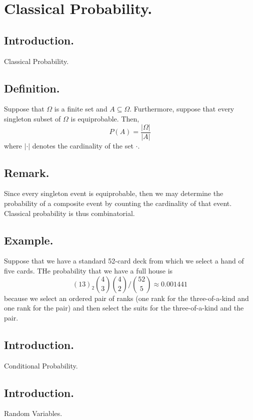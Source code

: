 \documentclass[titlepage]{article}
\begin{document}
\newpage \section{Classical Probability.}

\subsection{Introduction.} Classical Probability.

\subsection{Definition.} Suppose that $\Omega$ is a finite set and $A \subseteq \Omega$. Furthermore, suppose that every singleton subset of $\Omega$ is equiprobable. Then, 
$$P(A) = \frac{|\Omega|}{|A|}$$
where $|\cdot|$ denotes the cardinality of the set $\cdot$.

\subsection{Remark.} Since every singleton event is equiprobable, then we may determine the probability of a composite event by counting the cardinality of that event. Classical probability is thus combinatorial.

\subsection{Example.} Suppose that we have a standard 52-card deck from which we select a hand of five cards. THe probability that we have a full house is 
$$(13)_{2}\binom{4}{3}\binom{4}{2} / \binom{52}{5} \approx 0.001441$$
because we select an ordered pair of ranks (one rank for the three-of-a-kind and one rank for the pair) and then select the suits for the three-of-a-kind and the pair.

\newpage {}

\subsection{Introduction.} Conditional Probability.

\newpage {}

\subsection{Introduction.} Random Variables.
\end{document}
